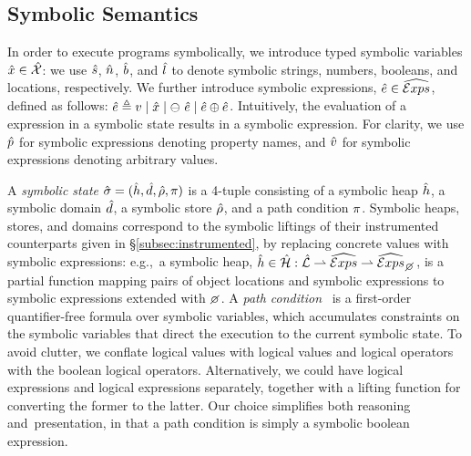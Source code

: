 \vspace*{-0.2cm}
\subsection{Symbolic Semantics}\label{subsec:symb:semantics}
In order to execute \jsil programs symbolically, we introduce typed symbolic variables $\hat{x} \in \hat{\mathcal{X}}$: 
we use $\hat{s}$, $\hat{n}$, $\hat{b}$, and $\hat{l}$ to denote symbolic strings, numbers, 
booleans, and locations, respectively. We further introduce symbolic expressions, $\hat{e} \in \widehat{\text{$\mathcal{E}xps$}}$, defined as follows: 
$\hat{e} \triangleq v \mid \hat{x} \mid \ominus\ \hat{e} \mid \hat{e} \oplus \hat{e}$. 
Intuitively, the evaluation of a \jsil expression in a symbolic state results in a symbolic expression. 
For clarity, we use $\hat{p}$ for symbolic expressions denoting property names, and $\hat{v}$ for symbolic
expressions denoting arbitrary values. 


A \emph{symbolic state} $\hat{\sigma} = (\hat{h}, \hat{d}, \hat\rho, \pi)$ is a 4-tuple consisting of a 
symbolic heap $\hat{h}$, a symbolic domain $\hat{d}$, a symbolic store $\hat\rho$, and a path condition $\pi$. 
Symbolic heaps, stores, and domains correspond to the symbolic liftings of their instrumented 
counterparts given in \S\ref{subsec:instrumented}, by replacing concrete values with symbolic expressions: e.g.,~a symbolic heap, $\sheap \in \sheaps : \slocs \partialmap \sexprs \partialmap \setext{\sexprs}{\none}$,
is a partial function mapping pairs of object locations and symbolic expressions to symbolic expressions
extended with $\none$. 
A \emph{path condition}~\cite{symb:exec:survey} is a first-order quantifier-free formula over symbolic variables, 
which accumulates constraints on the symbolic variables that direct 
the execution to the current symbolic state.
To avoid clutter, we conflate logical values with \jsil logical values and \jsil logical 
operators with the boolean logical operators. Alternatively, we could have \jsil logical expressions and logical expressions separately, together with a lifting 
function for converting the former to the latter. Our choice simplifies both reasoning 
and~presentation, in that a path condition is simply a \jsil symbolic boolean expression. 


